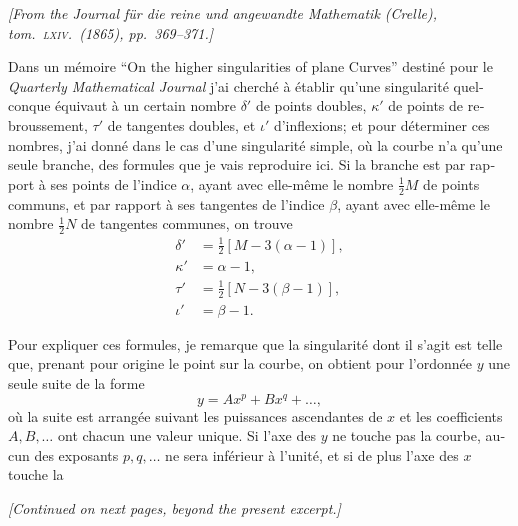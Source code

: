 \documentclass[11pt,a4paper]{article}
\begin{document}
\begin{otherlanguage}{french}

\noindent\textit{[From the \textit{Journal f\"ur die reine und angewandte Mathematik} (Crelle), tom.~\textsc{lxiv}.\ (1865), pp.~369--371.]}

\medskip

Dans un m\'emoire ``On the higher singularities of plane Curves'' destin\'e pour le \textit{Quarterly Mathematical Journal} j'ai cherch\'e \`a \'etablir qu'une singularit\'e quelconque \'equivaut \`a un certain nombre $\delta'$ de points doubles, $\kappa'$ de points de rebroussement, $\tau'$ de tangentes doubles, et $\iota'$ d'inflexions; et pour d\'eterminer ces nombres, j'ai donn\'e dans le cas d'une singularit\'e simple, o\`u la courbe n'a qu'une seule branche, des formules que je vais reproduire ici. Si la branche est par rapport \`a ses points de l'indice $\alpha$, ayant avec elle-m\^eme le nombre $\tfrac{1}{2}M$ de points communs, et par rapport \`a ses tangentes de l'indice $\beta$, ayant avec elle-m\^eme le nombre $\tfrac{1}{2}N$ de tangentes communes, on trouve
\[
\begin{aligned}
\delta' &= \tfrac{1}{2}[M - 3(\alpha - 1)],\\
\kappa' &= \alpha - 1,\\
\tau' &= \tfrac{1}{2}[N - 3(\beta - 1)],\\
\iota' &= \beta - 1.
\end{aligned}
\]

Pour expliquer ces formules, je remarque que la singularit\'e dont il s'agit est telle que, prenant pour origine le point sur la courbe, on obtient pour l'ordonn\'ee $y$ une seule suite de la forme
\[
y = Ax^{p} + Bx^{q} + \ldots,
\]
o\`u la suite est arrang\'ee suivant les puissances ascendantes de $x$ et les coefficients $A, B, \ldots$ ont chacun une valeur unique. Si l'axe des $y$ ne touche pas la courbe, aucun des exposants $p, q, \ldots$ ne sera inf\'erieur \`a l'unit\'e, et si de plus l'axe des $x$ touche la

\medskip
\noindent\textit{[Continued on next pages, beyond the present excerpt.]}

\end{otherlanguage}
\end{document}
